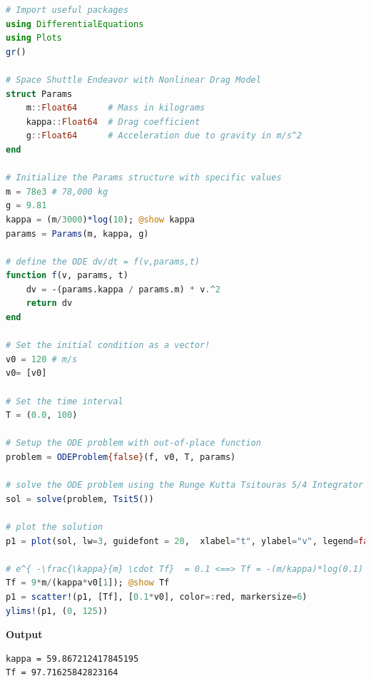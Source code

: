 \begin{lstlisting}[language=Julia,style=mystyle]
# Import useful packages
using DifferentialEquations
using Plots 
gr()

# Space Shuttle Endeavor with Nonlinear Drag Model
struct Params
    m::Float64      # Mass in kilograms
    kappa::Float64  # Drag coefficient
    g::Float64      # Acceleration due to gravity in m/s^2
end

# Initialize the Params structure with specific values
m = 78e3 # 78,000 kg 
g = 9.81
kappa = (m/3000)*log(10); @show kappa
params = Params(m, kappa, g)

# define the ODE dv/dt = f(v,params,t)
function f(v, params, t)
    dv = -(params.kappa / params.m) * v.^2
    return dv
end

# Set the initial condition as a vector!
v0 = 120 # m/s 
v0= [v0]

# Set the time interval
T = (0.0, 100) 

# Setup the ODE problem with out-of-place function
problem = ODEProblem{false}(f, v0, T, params)

# solve the ODE problem using the Runge Kutta Tsitouras 5/4 Integrator
sol = solve(problem, Tsit5())

# plot the solution
p1 = plot(sol, lw=3, guidefont = 20,  xlabel="t", ylabel="v", legend=false, color=:blue)

# e^{ -\frac{\kappa}{m} \cdot Tf}  = 0.1 <==> Tf = -(m/kappa)*log(0.1)
Tf = 9*m/(kappa*v0[1]); @show Tf
p1 = scatter!(p1, [Tf], [0.1*v0], color=:red, markersize=6)
ylims!(p1, (0, 125))
\end{lstlisting}
\textbf{Output} 
\begin{verbatim}
kappa = 59.867212417845195
Tf = 97.71625842823164
\end{verbatim}



